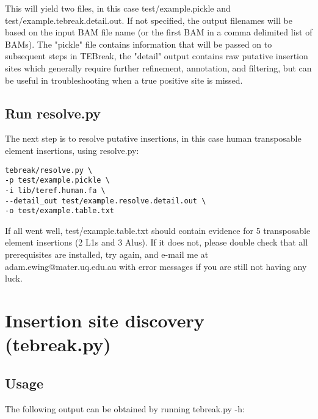 \documentclass[letterpaper,11pt]{article}
\begin{document}
This will yield two files, in this case test/example.pickle and test/example.tebreak.detail.out. If not specified, the output filenames will be based on the input BAM file name (or the first BAM in a comma delimited list of BAMs). The "pickle" file contains information that will be passed on to subsequent steps in TEBreak, the "detail" output contains raw putative insertion sites which generally require further refinement, annotation, and filtering, but can be useful in troubleshooting when a true positive site is missed.

\subsection{Run resolve.py}

The next step is to resolve putative insertions, in this case human transposable element insertions, using resolve.py:

\begin{verbatim}
tebreak/resolve.py \
-p test/example.pickle \
-i lib/teref.human.fa \
--detail_out test/example.resolve.detail.out \
-o test/example.table.txt
\end{verbatim}

If all went well, test/example.table.txt should contain evidence for 5 transposable element insertions (2 L1s and 3 Alus). If it does not, please double check that all prerequisites are installed, try again, and e-mail me at adam.ewing@mater.uq.edu.au with error messages if you are still not having any luck.

\section{Insertion site discovery (tebreak.py)}
\subsection{Usage}

The following output can be obtained by running tebreak.py -h:
\end{document}
